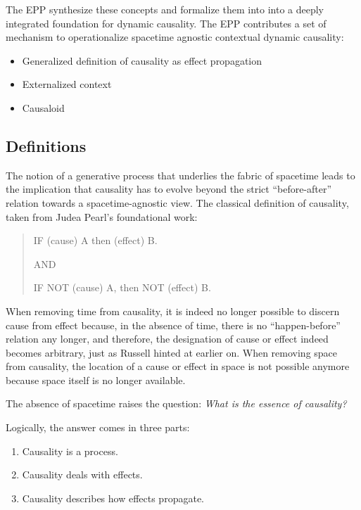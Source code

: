 The EPP synthesize these concepts and formalize them into into a deeply integrated foundation for
dynamic causality. The EPP contributes a set of mechanism to operationalize spacetime agnostic contextual dynamic causality:

\begin{itemize}
    \item Generalized definition of causality as effect propagation
    \item Externalized context
    \item Causaloid
\end{itemize}

\subsection{Definitions}
\label{sec:epp_definition}

The notion of a generative process that underlies the fabric of spacetime leads to the implication that causality has to evolve beyond the strict “before-after” relation towards a spacetime-agnostic view. The classical definition of causality, taken from Judea Pearl's foundational work\cite{pearl2000causality}:

\begin{quote}
    IF (cause) A then (effect) B.

    AND

    IF NOT (cause) A, then NOT (effect) B.
\end{quote}

When removing time from causality, it is indeed no longer possible to discern cause from effect because, in the absence of time, there is no “happen-before” relation any longer, and therefore, the designation of cause or effect indeed becomes arbitrary, just as Russell hinted at earlier on. When removing space from causality, the location of a cause or effect in space is not possible anymore because space itself is no longer available.

\newpage

The absence of spacetime raises the question: \textit{What is the essence of causality?}

Logically, the answer comes in three parts:

\begin{enumerate}
    \item Causality is a process.
    \item Causality deals with effects.
    \item Causality describes how effects propagate.
\end{enumerate}

